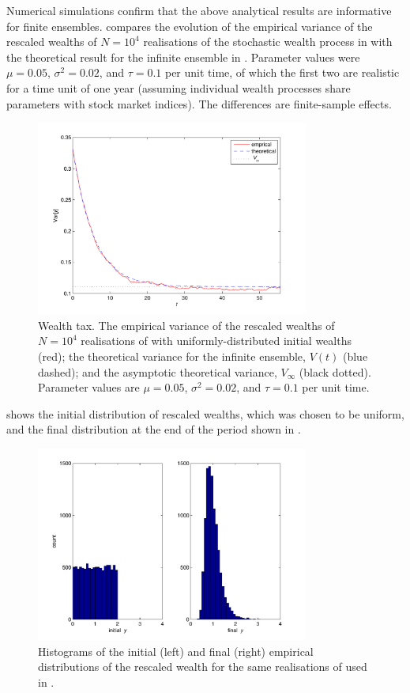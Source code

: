 Numerical simulations confirm that the above analytical results are informative for finite ensembles. 
 compares the 
evolution of the empirical variance of the rescaled wealths of $N=10^4$ realisations of the 
stochastic wealth process in  with the theoretical result for the infinite ensemble 
in . Parameter values were $\mu=0.05$, $\sigma^2=0.02$, and $\tau=0.1$ per 
unit time, of which the first two are realistic for a time unit of one year \cite{PetersAdamou2013} 
(assuming individual wealth processes share parameters with stock market indices). The 
differences are finite-sample effects.
\begin{figure}
\bc
\includegraphics[width=0.8\textwidth]{./chapter_3/figs/var_wealth.pdf}
\caption{Wealth tax. The empirical variance of the rescaled wealths of $N=10^4$ realisations of 
 with uniformly-distributed initial wealths (red); the theoretical variance for the infinite 
ensemble, $V(t)$ (blue dashed); and the asymptotic theoretical variance, $V_\infty$ (black dotted). 
Parameter values are $\mu=0.05$, $\sigma^2=0.02$, and $\tau=0.1$ per unit time.}
\ec
\end{figure}
 shows the initial distribution of rescaled wealths, which was chosen to be uniform, 
and the final distribution at the end of the period shown in .
\begin{figure}
\bc
\includegraphics[width=0.8\textwidth]{./chapter_3/figs/hist_wealth.pdf}
\caption{Histograms of the initial (left) and final (right) empirical distributions of the rescaled 
wealth for the same realisations of  used in .}
\ec
\end{figure}

